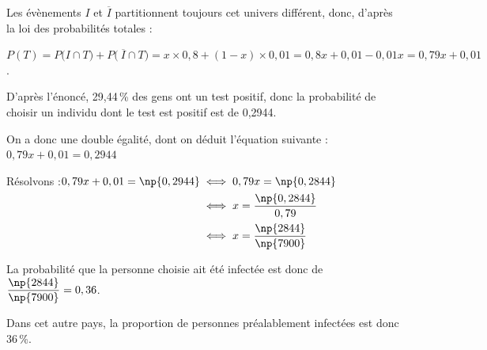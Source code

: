 	Les évènements $I$ et $\overline{I}$ partitionnent toujours cet univers différent, donc, d'après la loi des probabilités totales :

$P(T) = P\big(I\cap T\big) + P\big(~\overline{I} \cap T\big) = x \times 0,8 + (1 - x) \times 0,01 = 0,8x + 0,01 - 0,01x = 0,79x + 0,01$.

D'après l'énoncé, 29,44\,\% des gens ont un test positif, donc la probabilité de choisir un individu dont le test est positif est de 0,2944.

On a donc une double égalité, dont on déduit l'équation suivante : \quad $0,79x + 0,01 = 0,2944$

Résolvons :\quad $\begin{aligned}[t] 0,79x + 0,01 = \np{0,2944}&\iff 0,79x = \np{0,2844}\\
&\iff x = \dfrac{\np{0,2844}}{0,79}\\
&\iff x = \dfrac{\np{2844}}{\np{7900}}\end{aligned}$

La probabilité que la personne choisie ait été infectée est donc de $\dfrac{\np{2844}}{\np{7900}} = 0,36$.

Dans cet autre pays, la proportion de personnes préalablement infectées est donc 36\,\%.

\bigskip
